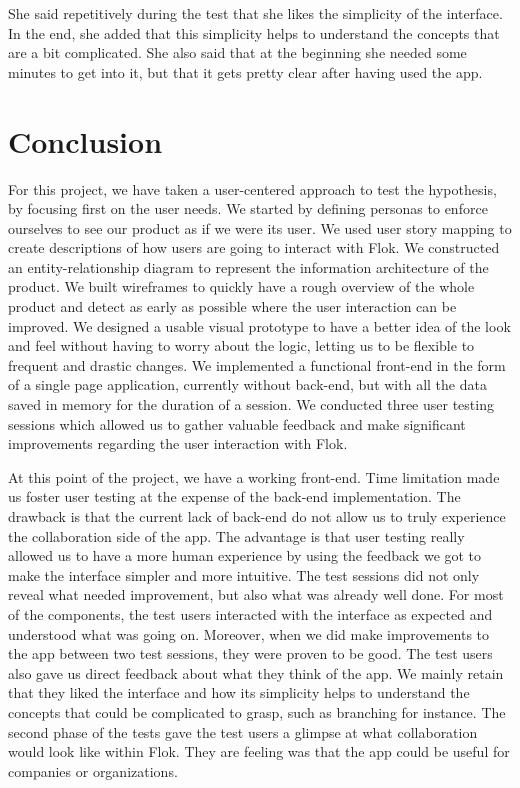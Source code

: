 \documentclass[a4paper,12pt, oneside]{article}
\begin{document}
She said repetitively during the test that she likes the simplicity of the interface.
In the end, she added that this simplicity helps to understand the concepts that are a bit complicated.
She also said that at the beginning she needed some minutes to get into it, but that it gets pretty clear after having used the app.

\section{Conclusion}

For this project, we have taken a user-centered approach to test the hypothesis, by focusing first on the user needs.
We started by defining personas to enforce ourselves to see our product as if we were its user.
We used user story mapping to create descriptions of how users are going to interact with Flok.
We constructed an entity-relationship diagram to represent the information architecture of the product.
We built wireframes to quickly have a rough overview of the whole product and detect as early as possible where the user interaction can be improved.
We designed a usable visual prototype to have a better idea of the look and feel without having to worry about the logic, letting us to be flexible to frequent and drastic changes.
We implemented a functional front-end in the form of a single page application, currently without back-end, but with all the data saved in memory for the duration of a session.
We conducted three user testing sessions which allowed us to gather valuable feedback and make significant improvements regarding the user interaction with Flok.

At this point of the project, we have a working front-end.
Time limitation made us foster user testing at the expense of the back-end implementation.
The drawback is that the current lack of back-end do not allow us to truly experience the collaboration side of the app.
The advantage is that user testing really allowed us to have a more human experience by using the feedback we got to make the interface simpler and more intuitive.
The test sessions did not only reveal what needed improvement, but also what was already well done.
For most of the components, the test users interacted with the interface as expected and understood what was going on.
Moreover, when we did make improvements to the app between two test sessions, they were proven to be good.
The test users also gave us direct feedback about what they think of the app.
We mainly retain that they liked the interface and how its simplicity helps to understand the concepts that could be complicated to grasp, such as branching for instance.
The second phase of the tests gave the test users a glimpse at what collaboration would look like within Flok.
They are feeling was that the app could be useful for companies or organizations.
\end{document}
